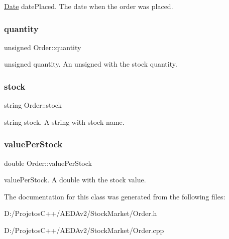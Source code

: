 \hyperlink{class_date}{Date} date\+Placed. The date when the order was placed. \mbox{\label{class_order_ab02e2baeb8c57217a20c9124df3ba11d}} 
\subsubsection{\texorpdfstring{quantity}{quantity}}
{\footnotesize\ttfamily unsigned Order\+::quantity\hspace{0.3cm}{\ttfamily [protected]}}

unsigned quantity. An unsigned with the stock quantity. \mbox{\label{class_order_aafb6dfab2a1c253eefd78840b27dcd2e}} 
\subsubsection{\texorpdfstring{stock}{stock}}
{\footnotesize\ttfamily string Order\+::stock\hspace{0.3cm}{\ttfamily [protected]}}

string stock. A string with stock name. \mbox{\label{class_order_ab5d512fb35483413b9fe200d58324c2e}} 
\subsubsection{\texorpdfstring{value\+Per\+Stock}{valuePerStock}}
{\footnotesize\ttfamily double Order\+::value\+Per\+Stock\hspace{0.3cm}{\ttfamily [protected]}}

value\+Per\+Stock. A double with the stock value. 

The documentation for this class was generated from the following files\+:\begin{DoxyCompactItemize}
\item 
D\+:/\+Projetos\+C++/\+A\+E\+D\+Av2/\+Stock\+Market/Order.\+h\item 
D\+:/\+Projetos\+C++/\+A\+E\+D\+Av2/\+Stock\+Market/Order.\+cpp\end{DoxyCompactItemize}
